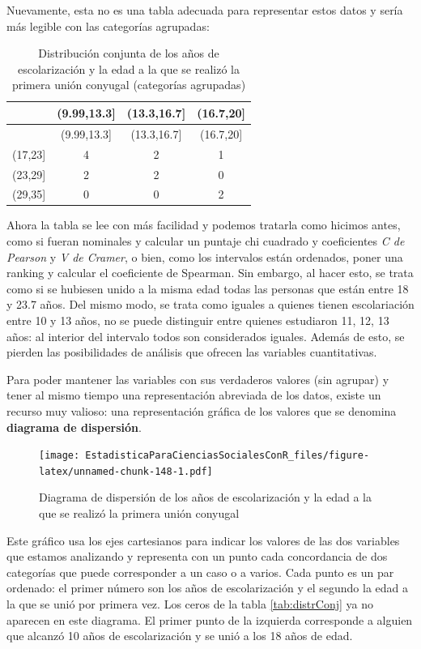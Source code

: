 \documentclass[]{book}
\begin{document}
Nuevamente, esta no es una tabla adecuada para representar estos datos y sería más legible con las categorías agrupadas:

\begin{longtable}[]{@{}lccc@{}}
\caption{\label{tab:unnamed-chunk-147}Distribución conjunta de los años de escolarización y la edad a la que se realizó la primera unión conyugal (categorías agrupadas)}\tabularnewline
\toprule
& (9.99,13.3{]} & (13.3,16.7{]} & (16.7,20{]}\tabularnewline
\midrule
\endfirsthead
\toprule
& (9.99,13.3{]} & (13.3,16.7{]} & (16.7,20{]}\tabularnewline
\midrule
\endhead
(17,23{]} & 4 & 2 & 1\tabularnewline
(23,29{]} & 2 & 2 & 0\tabularnewline
(29,35{]} & 0 & 0 & 2\tabularnewline
\bottomrule
\end{longtable}

Ahora la tabla se lee con más facilidad y podemos tratarla como hicimos antes, como si fueran nominales y calcular un puntaje chi cuadrado y coeficientes \emph{C de Pearson} y \emph{V de Cramer}, o bien, como los intervalos están ordenados, poner una ranking y calcular el coeficiente de Spearman. Sin embargo, al hacer esto, se trata como si se hubiesen unido a la misma edad todas las personas que están entre 18 y 23.7 años. Del mismo modo, se trata como iguales a quienes tienen escolariación entre 10 y 13 años, no se puede distinguir entre quienes estudiaron 11, 12, 13 años: al interior del intervalo todos son considerados iguales. Además de esto, se pierden las posibilidades de análisis que ofrecen las variables cuantitativas.

Para poder mantener las variables con sus verdaderos valores (sin
agrupar) y tener al mismo tiempo una representación abreviada de los
datos, existe un recurso muy valioso: una representación gráfica de los valores que se denomina \textbf{diagrama de dispersión}.

\begin{figure}
\centering
\texttt{[image: EstadisticaParaCienciasSocialesConR\_files/figure-latex/unnamed-chunk-148-1.pdf]}
\caption{\label{fig:unnamed-chunk-148}Diagrama de dispersión de los años de escolarización y la edad a la que se realizó la primera unión conyugal}
\end{figure}

Este gráfico usa los ejes cartesianos para indicar los valores de las
dos variables que estamos analizando y representa con un punto cada
concordancia de dos categorías que puede corresponder a un caso o a
varios. Cada punto es un par ordenado: el primer número son los años de escolarización y el segundo la edad a la que se unió por primera vez. Los ceros de la tabla \ref{tab:distrConj} ya no aparecen en este diagrama. El primer punto de la izquierda corresponde a alguien que alcanzó 10 años de escolarización y se unió a los 18 años de edad.
\end{document}
